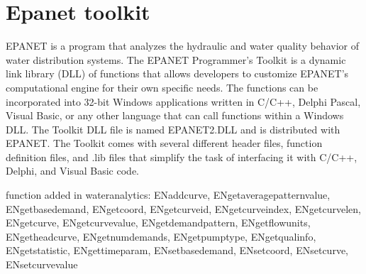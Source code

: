 \chapter{Epanet toolkit}

EPANET is a program that analyzes the hydraulic and water quality behavior of
water distribution systems. The EPANET Programmer's Toolkit is a dynamic link 
library (DLL) of functions that allows developers to customize EPANET's computational 
engine for their own specific needs. The functions can be incorporated into 32-bit Windows 
applications written in C/C++, Delphi Pascal, Visual Basic, or any other language that can 
call functions within a Windows DLL. The Toolkit DLL file is named EPANET2.DLL and is 
distributed with EPANET. The Toolkit comes with several different header files, 
function definition files, and .lib files that simplify the task of interfacing 
it with C/C++, Delphi, and Visual Basic code.

function added in wateranalytics:
ENaddcurve, ENgetaveragepatternvalue, ENgetbasedemand, ENgetcoord, ENgetcurveid, ENgetcurveindex, 
ENgetcurvelen, ENgetcurve, ENgetcurvevalue, ENgetdemandpattern, ENgetflowunits, ENgetheadcurve, 
ENgetnumdemands, ENgetpumptype, ENgetqualinfo, ENgetstatistic, ENgettimeparam, ENsetbasedemand, 
ENsetcoord, ENsetcurve, ENsetcurvevalue





